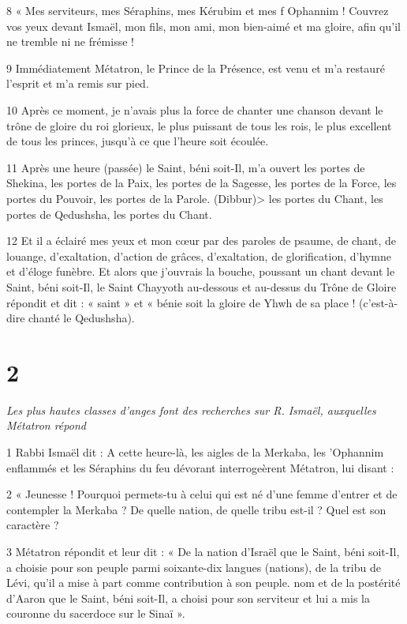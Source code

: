 \par 8 « Mes serviteurs, mes Séraphins, mes Kérubim et mes f Ophannim ! Couvrez vos yeux devant Ismaël, mon fils, mon ami, mon bien-aimé et ma gloire, afin qu'il ne tremble ni ne frémisse !

\par 9 Immédiatement Métatron, le Prince de la Présence, est venu et m'a restauré l'esprit et m'a remis sur pied.

\par 10 Après ce moment, je n'avais plus la force de chanter une chanson devant le trône de gloire du roi glorieux, le plus puissant de tous les rois, le plus excellent de tous les princes, jusqu'à ce que l'heure soit écoulée.

\par 11 Après une heure (passée) le Saint, béni soit-Il, m'a ouvert les portes de Shekina, les portes de la Paix, les portes de la Sagesse, les portes de la Force, les portes du Pouvoir, les portes de la Parole. (Dibbur)> les portes du Chant, les portes de Qedushsha, les portes du Chant.

\par 12 Et il a éclairé mes yeux et mon cœur par des paroles de psaume, de chant, de louange, d'exaltation, d'action de grâces, d'exaltation, de glorification, d'hymne et d'éloge funèbre. Et alors que j'ouvrais la bouche, poussant un chant devant le Saint, béni soit-Il, le Saint Chayyoth au-dessous et au-dessus du Trône de Gloire répondit et dit : « saint » et « bénie soit la gloire de Yhwh de sa place ! (c'est-à-dire chanté le Qedushsha).

\chapter{2}

\par \textit{Les plus hautes classes d'anges font des recherches sur R. Ismaël, auxquelles Métatron répond}

\par 1 Rabbi Ismaël dit : A cette heure-là, les aigles de la Merkaba, les 'Ophannim enflammés et les Séraphins du feu dévorant interrogeèrent Métatron, lui disant :

\par 2 « Jeunesse ! Pourquoi permets-tu à celui qui est né d'une femme d'entrer et de contempler la Merkaba ? De quelle nation, de quelle tribu est-il ? Quel est son caractère ?

\par 3 Métatron répondit et leur dit : « De la nation d'Israël que le Saint, béni soit-Il, a choisie pour son peuple parmi soixante-dix langues (nations), de la tribu de Lévi, qu'il a mise à part comme contribution à son peuple. nom et de la postérité d'Aaron que le Saint, béni soit-Il, a choisi pour son serviteur et lui a mis la couronne du sacerdoce sur le Sinaï ».

